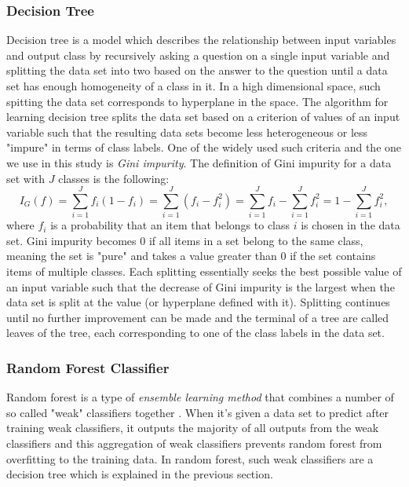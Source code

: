 \documentclass{article}
\begin{document}
		\subsubsection{Decision Tree}
		Decision tree is a model which describes the relationship between input variables and output class by recursively asking a question on a single input variable and splitting the data set into two based on the answer to the question until a data set has enough homogeneity of a class in it. In a high dimensional space, such spitting the data set corresponds to hyperplane in the space. The algorithm for learning decision tree splits the data set based on a criterion of values of an input variable such that the resulting data sets become less heterogeneous or less "impure" in terms of class labels. One of the widely used such criteria and the one we use in this study is \textit{Gini impurity}. The definition of Gini impurity for a data set with $J$ classes is the following:
	\begin{equation}
	I_G(f) = \sum_{i=1}^J f_i(1-f_i) = \sum_{i=1}^J (f_i-f_i^2) =  \sum_{i=1}^J f_i - \sum_{i=1}^J f_i^2 = 1- \sum_{i=1}^J f_i^2,
	\end{equation}
where $f_i$ is a probability that an item that belongs to class $i$ is chosen in the data set. Gini impurity becomes $0$ if all items in a set belong to the same class, meaning the set is "pure" and takes a value greater than $0$ if the set contains items of multiple classes. Each splitting essentially seeks the best possible value of an input variable such that the decrease of Gini impurity is the largest when the data set is split at the value (or hyperplane defined with it). Splitting continues until no further improvement can be made and the terminal of a tree are called leaves of the tree, each corresponding to one of the class labels in the data set.
		
	
		\subsubsection{Random Forest Classifier}
Random forest is a type of \textit{ensemble learning method} that combines a number of so called "weak" classifiers together \cite{RandomForest}. When it's given a data set to predict after training weak classifiers, it outputs the majority of all outputs from the weak classifiers and this aggregation of weak classifiers prevents random forest from overfitting to the training data. In random forest, such weak classifiers are a decision tree which is explained in the previous section.
\end{document}
